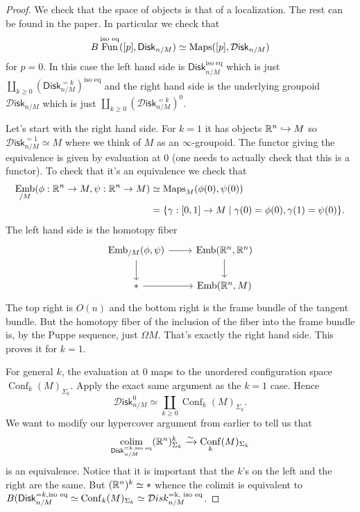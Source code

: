 \documentclass{amsart}
\DeclareMathOperator{\Fun}{Fun}
\DeclareMathOperator{\Emb}{Emb}
\DeclareMathOperator{\Conf}{Conf}
\begin{document}
\begin{proof}
    We check that the space of objects is that of a localization. The rest can be found
    in the paper. In particular we check that
    \begin{equation*}
        B\Fun^\text{iso eq}([p],\mathsf{Disk}_{n/M}) \simeq \Maps([p], \mathcal{D}\mathsf{isk}_{n/M})
    \end{equation*}
    for $p=0$. In this case the left hand side is $\mathsf{Disk}_{n/M}^\text{iso eq}$ which
    is just $\coprod_{k\geq 0}(\mathsf{Disk}_{n/M}^{=k})^\text{iso eq}$ and the right
    hand side is the underlying groupoid $\mathcal{D}\mathsf{isk}_{n/M}$ which is just
    $\coprod_{k\geq 0}(\mathcal{D}\mathsf{isk}_{n/M}^{=k})^0$.

    Let's start with the right hand side. For $k=1$ it has objects $\mathbb{R}^n\hookrightarrow M$
    so $\mathcal{D}\mathsf{isk}_{n/M}^{=1}\simeq M$ where we think of $M$ as an $\infty$-groupoid.
    The functor giving the equivalence is given by evaluation at 0 (one needs to actually check
    that this is a functor). To check that it's an equivalence we check that
    \begin{align*}
        \Emb_{/M}(\phi:\R^n\to M, \psi:\R^n\to M) &\simeq \Maps_M(\phi(0),\psi(0)) \\
        &=\{\gamma:[0,1]\to M\mid \gamma(0)=\phi(0), \gamma(1)=\psi(0)\}.
    \end{align*}
    The left hand side is the homotopy fiber
    \begin{equation*}
        \begin{tikzcd}
            \Emb_{/M}(\phi,\psi) \rar\dar & \Emb(\R^n,\R^n)\dar \\
            * \rar & \Emb(\R^n,M)
        \end{tikzcd}
    \end{equation*}
    The top right is $O(n)$ and the bottom right is the frame bundle of the tangent bundle.
    But the homotopy fiber of the inclusion of the fiber into the frame bundle is,
    by the Puppe sequence, just $\Omega M$. That's exactly the right hand side.
    This proves it for $k=1$.

    For general $k$, the evaluation at 0 maps to the unordered configuration space $\Conf_k(M)_{\Sigma_k}$.
    Apply the exact same argument as the $k=1$ case. Hence
    \begin{equation*}
        \mathcal{D}\mathsf{isk}_{n/M}^0 \simeq \coprod_{k\geq 0}\Conf_k(M)_{\Sigma_k}.
    \end{equation*}
    We want to modify our hypercover argument from earlier to tell us that
    \begin{equation*}
        \colim_{\mathsf{Disk}_{n/M}^{=k, \text{iso eq}}}(\R^n)^k_{\Sigma_k} \xrightarrow{\sim}\Conf_k(M)_{\Sigma_k}
    \end{equation*}
    is an equivalence. Notice that it is important that the $k$'s on the left and the
    right are the same. But $(\mathbb{R}^n)^k\simeq *$ whence the colimit is equivalent to
    $B(\mathsf{Disk}_{n/M}^{=k, \text{iso eq}}\simeq\Conf_k(M)_{\Sigma_k}\simeq \mathcal{D}isk_{n/M}^\text{=k, \text{iso eq}}$.
\end{proof}
\end{document}
